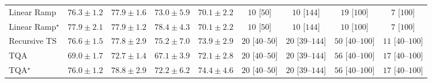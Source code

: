 \begin{tabular}{l|cccc|cccc|}
Linear Ramp & {\cellcolor[HTML]{8B5CAA}} \color[HTML]{F1F1F1} $76.3\pm 1.2$ & {\cellcolor[HTML]{894DA3}} \color[HTML]{F1F1F1} $77.9\pm 1.6$ & {\cellcolor[HTML]{8C7CB9}} \color[HTML]{F1F1F1} $73.0\pm 5.9$ & {\cellcolor[HTML]{8D98C7}} \color[HTML]{F1F1F1} $70.1\pm 2.2$ & {\cellcolor[HTML]{FFF7F3}} \color[HTML]{000000} $10$ [$50$] & {\cellcolor[HTML]{FFF7F3}} \color[HTML]{000000} $10$ [$144$] & {\cellcolor[HTML]{FFF5F1}} \color[HTML]{000000} $19$ [$100$] & {\cellcolor[HTML]{FFF7F3}} \color[HTML]{000000} $7$ [$100$] \\
Linear Ramp$^\star$ & {\cellcolor[HTML]{894DA3}} \color[HTML]{F1F1F1} $77.9\pm 2.1$ & {\cellcolor[HTML]{894DA3}} \color[HTML]{F1F1F1} $77.9\pm 1.2$ & {\cellcolor[HTML]{8948A0}} \color[HTML]{F1F1F1} $78.4\pm 4.3$ & {\cellcolor[HTML]{8D98C7}} \color[HTML]{F1F1F1} $70.1\pm 2.2$ & {\cellcolor[HTML]{FFF7F3}} \color[HTML]{000000} $10$ [$50$] & {\cellcolor[HTML]{FFF7F3}} \color[HTML]{000000} $10$ [$144$] & {\cellcolor[HTML]{FFF7F3}} \color[HTML]{000000} $10$ [$100$] & {\cellcolor[HTML]{FFF7F3}} \color[HTML]{000000} $7$ [$100$] \\
Recursive TS & {\cellcolor[HTML]{8A59A8}} \color[HTML]{F1F1F1} $76.6\pm 1.5$ & {\cellcolor[HTML]{894FA3}} \color[HTML]{F1F1F1} $77.8\pm 2.9$ & {\cellcolor[HTML]{8C66AF}} \color[HTML]{F1F1F1} $75.2\pm 7.0$ & {\cellcolor[HTML]{8C74B5}} \color[HTML]{F1F1F1} $73.9\pm 2.9$ & {\cellcolor[HTML]{FFF4F0}} \color[HTML]{000000} $20$ [$40$--$50$] & {\cellcolor[HTML]{FFF4F0}} \color[HTML]{000000} $20$ [$39$--$144$] & {\cellcolor[HTML]{FEEEEA}} \color[HTML]{000000} $50$ [$40$--$100$] & {\cellcolor[HTML]{FFF6F2}} \color[HTML]{000000} $11$ [$40$--$100$] \\
TQA & {\cellcolor[HTML]{91A1CC}} \color[HTML]{F1F1F1} $69.0\pm 1.7$ & {\cellcolor[HTML]{8C7EBA}} \color[HTML]{F1F1F1} $72.7\pm 1.4$ & {\cellcolor[HTML]{99B2D5}} \color[HTML]{000000} $67.1\pm 3.9$ & {\cellcolor[HTML]{8C85BE}} \color[HTML]{F1F1F1} $72.1\pm 2.8$ & {\cellcolor[HTML]{FFF4F0}} \color[HTML]{000000} $20$ [$40$--$50$] & {\cellcolor[HTML]{FFF4F0}} \color[HTML]{000000} $20$ [$39$--$144$] & {\cellcolor[HTML]{FEECE9}} \color[HTML]{000000} $56$ [$40$--$100$] & {\cellcolor[HTML]{FFF5F1}} \color[HTML]{000000} $17$ [$40$--$100$] \\
TQA$^\star$ & {\cellcolor[HTML]{8B60AC}} \color[HTML]{F1F1F1} $76.0\pm 1.2$ & {\cellcolor[HTML]{88449E}} \color[HTML]{F1F1F1} $78.8\pm 2.9$ & {\cellcolor[HTML]{8C84BD}} \color[HTML]{F1F1F1} $72.2\pm 6.2$ & {\cellcolor[HTML]{8C6EB3}} \color[HTML]{F1F1F1} $74.4\pm 4.6$ & {\cellcolor[HTML]{FFF4F0}} \color[HTML]{000000} $20$ [$40$--$50$] & {\cellcolor[HTML]{FFF4F0}} \color[HTML]{000000} $20$ [$39$--$144$] & {\cellcolor[HTML]{FEECE9}} \color[HTML]{000000} $56$ [$40$--$100$] & {\cellcolor[HTML]{FFF5F1}} \color[HTML]{000000} $17$ [$40$--$100$] \\

\end{tabular}

